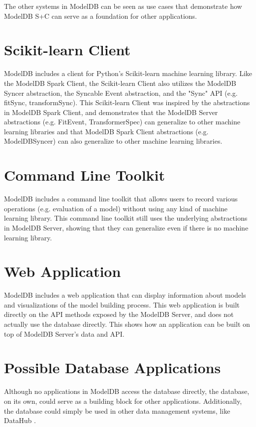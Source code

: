 The other systems in ModelDB can be seen as use cases that demonstrate how ModelDB S+C
can serve as a foundation for other applications.

\section{Scikit-learn Client}
ModelDB includes a client for Python's Scikit-learn machine learning library. Like the
ModelDB Spark Client, the Scikit-learn Client also utilizes the ModelDB Syncer abstraction,
the Syncable Event abstraction, and the "Sync" API (e.g. fitSync, transformSync). This Scikit-learn
Client was inspired by the abstractions in ModelDB Spark Client, and demonstrates that the ModelDB Server
abstractions (e.g. FitEvent, TransformerSpec) can generalize to other machine learning libraries and that
ModelDB Spark Client abstractions (e.g. ModelDBSyncer) can also generalize to other machine learning libraries.

\section{Command Line Toolkit}
ModelDB includes a command line toolkit that allows users to record various operations (e.g.
evaluation of a model) without using any kind of machine learning library. This command line toolkit still
uses the underlying abstractions in ModelDB Server, showing that they can generalize even if there is no machine learning
library.

\section{Web Application}
ModelDB includes a web application that can display information about models and visualizations of
the model building process. This web application is built directly on the API methods exposed by the ModelDB Server,
and does not actually use the database directly. This shows how an application can be built on top of ModelDB Server's 
data and API.

\section{Possible Database Applications}
Although no applications in ModelDB access the database directly, the database, on its own, 
could serve as a building block for other applications. Additionally, the database could simply be used in other data management
systems, like DataHub \cite{datahub}.
